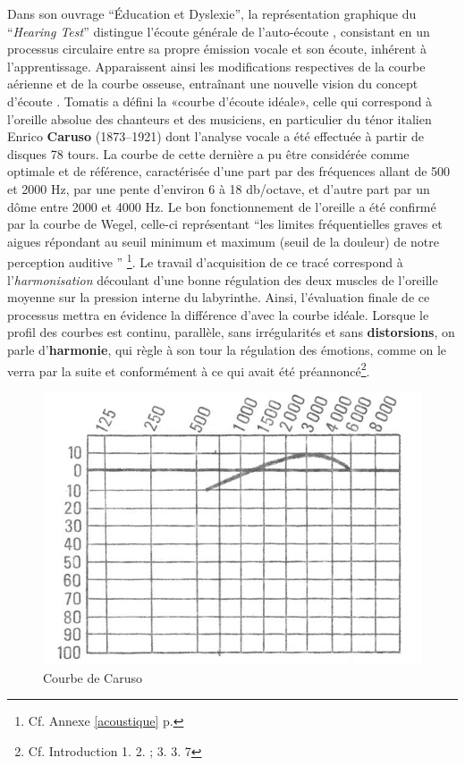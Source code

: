 Dans son ouvrage ``Éducation et
    Dyslexie''\autocite{tomatis:education}, la représentation graphique du
 ``\emph{Hearing Test}'' distingue l'écoute générale de
 l'auto-écoute \autocite{Tomatislangage}, consistant  en un processus
   circulaire entre sa propre  émission vocale et son écoute, inhérent
   à l'apprentissage.
 Apparaissent ainsi les modifications respectives
 de la courbe aérienne et de la courbe osseuse, entraînant une nouvelle vision
 du concept d'écoute \autocite{tomatis_conf}.%
       Tomatis a défini la «courbe d'écoute idéale», celle qui correspond à l'oreille absolue
des chanteurs et des musiciens, en particulier du ténor italien Enrico
\textbf{Caruso} (1873--1921) dont l'analyse vocale a été effectuée à partir de
disques 78 tours. La courbe de cette dernière a pu être considérée comme
optimale et de référence, caractérisée d'une part par des fréquences allant de 500 et 2000
Hz, par une pente d\textquoteright environ 6 à 18 db/octave,
et d'autre part par un dôme entre 2000 et 4000 Hz.
Le bon fonctionnement de l'oreille a été confirmé par la courbe
de Wegel, celle-ci représentant   \enquote {les limites fréquentielles graves et aigues répondant au seuil 
minimum et maximum (seuil de la douleur) de notre perception auditive } 
\autocite{Tomatislangage}\footnote{Cf. Annexe \ref{acoustique} p. \pageref{acoustique}}.
 Le travail d'acquisition de ce tracé correspond à l'\textsl{harmonisation}
découlant d'une bonne régulation des deux muscles de l'oreille moyenne
sur la pression interne du
labyrinthe.
Ainsi, l'évaluation finale de ce processus mettra en évidence la différence
d'avec la courbe idéale.
Lorsque le profil des
courbes est continu, parallèle, sans irrégularités et sans
\textbf{distorsions}, on parle d'\textbf{harmonie}, qui règle à son tour
la régulation des émotions, comme on le verra par la suite et conformément à
ce qui avait été préannoncé\footnote{Cf. Introduction 1. 2. ; 3. 3. 7}.
\begin{center}
	\begin{figure}
		\includegraphics[width=0.9\linewidth]{images/graphiques/courbecarusoideale}	
		\caption{Courbe de Caruso}
	\end{figure}	
\end{center}
